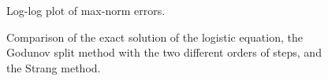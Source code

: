 \documentclass[journal,onecolumn]{IEEEtran}
\begin{document}
\begin{figure}[!ht]
	\centering
	\hfil
	\caption{Log-log plot of max-norm errors.}
	\label{fig:err}
\end{figure}

\begin{figure}[!ht]
	\centering

	\caption{Comparison of the exact solution of the logistic equation, the Godunov split method with the two different orders of steps, and the Strang method.}
	\label{fig:AccuracyLogistic}
\end{figure}
\end{document}
